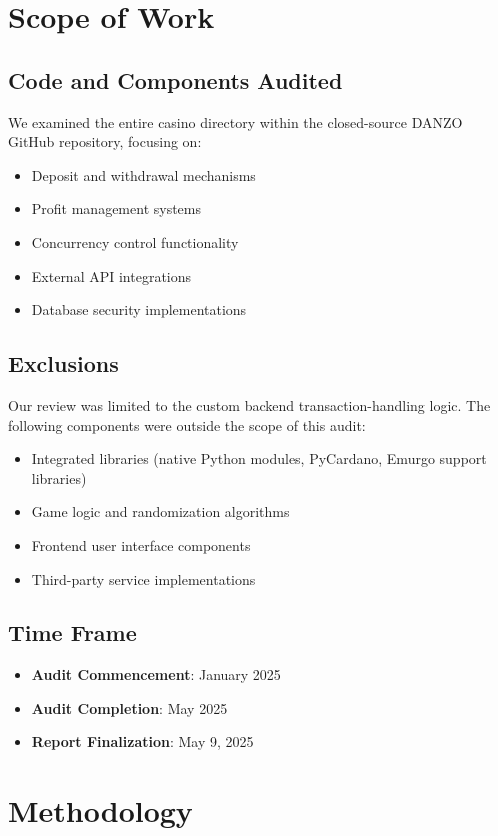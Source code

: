 \documentclass[11pt,a4paper]{article}
\begin{document}
\section{Scope of Work}

\subsection{Code and Components Audited}
We examined the entire casino directory within the closed-source DANZO GitHub repository, focusing on:
\begin{itemize}
    \item Deposit and withdrawal mechanisms
    \item Profit management systems
    \item Concurrency control functionality
    \item External API integrations
    \item Database security implementations
\end{itemize}

\subsection{Exclusions}
Our review was limited to the custom backend transaction-handling logic. The following components were outside the scope of this audit:
\begin{itemize}
    \item Integrated libraries (native Python modules, PyCardano, Emurgo support libraries)
    \item Game logic and randomization algorithms
    \item Frontend user interface components
    \item Third-party service implementations
\end{itemize}

\subsection{Time Frame}
\begin{itemize}
    \item \textbf{Audit Commencement}: January 2025
    \item \textbf{Audit Completion}: May 2025
    \item \textbf{Report Finalization}: May 9, 2025
\end{itemize}

\section{Methodology}
\end{document}
